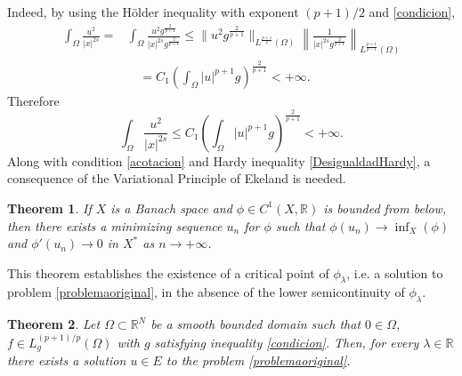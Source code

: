\documentclass[preprint,12pt]{elsarticle}
\newtheorem{theorem}{Theorem}[section]
\begin{document}
		Indeed, by using the H\"older inequality with exponent $(p+1)/2$ and \eqref{condicion}, 
		\begin{align*}
			\int_\Omega \frac{u^2}{|x|^{2s}}=&\int_{\Omega} \frac{u^2g^{\frac{2}{p+1}}}{|x|^{2s}g^{\frac{2}{p+1}}}\leq 
			\| u^2g^{\frac{2}{p+1}}\|_{L^{\frac{p+1}{2}}(\Omega)} \left\| \frac{1}{|x|^{2s}g^{\frac{2}{p+1}}} 
			\right\|_{L^{\frac{p+1}{p-1}}(\Omega)}
			\\&\quad=C_1\left(\int_{\Omega}|u|^{p+1}g\right)^{\frac{2}{p+1}}< +\infty.
		\end{align*}
		Therefore 
		\begin{equation*}
			\int_\Omega \frac{u^2}{|x|^{2s}} \leq  C_1\left(\int_{\Omega}|u|^{p+1}g\right)^{\frac{2}{p+1}}< +\infty.
		\end{equation*}
		Along with condition \eqref{acotacion} and Hardy inequality \eqref{DesigualdadHardy}, a consequence of the Variational Principle of Ekeland  \cite[Theorem 7.2]{Cha} is needed.
		\begin{theorem}\label{ekeland}
			If $X$ is a Banach space and $\phi\in C^1(X,\mathbb{R})$ is bounded from below, then there exists a minimizing sequence $u_n$ for $\phi$ such that $\phi(u_n)\rightarrow \inf_X(\phi)$ and $\phi'(u_n)\rightarrow 0$ in $X^*$ as $n\rightarrow+\infty$.
		\end{theorem}
		This theorem establishes the existence of a critical point of $\phi_{\lambda}$, i.e. a solution to problem \eqref{problemaoriginal}, in the absence of the lower semicontinuity of $\phi_{\lambda}$.
		\begin{theorem}\label{teo1}
			Let $\Omega\subset \mathbb{R}^N$ be a smooth bounded domain such that $0\in \Omega$,  $f \in L^{(p+1)/p}_g(\Omega)$ with $g$ satisfying  inequality \eqref{condicion}. Then, for every $\lambda\in \mathbb{R}$ there exists a solution $u\in E$ to the problem \eqref{problemaoriginal}. 
			
		\end{theorem}
\end{document}
